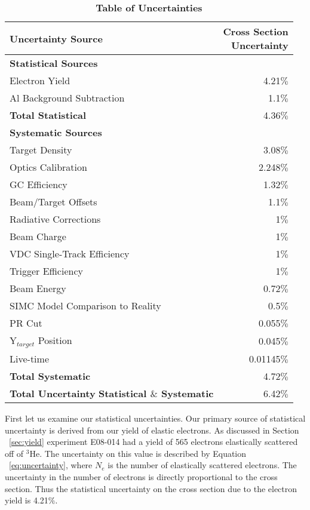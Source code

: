 \begin{table}[!h]
\centering
\begin{tabular}{|l | r |}
\hline
\textbf{Uncertainty Source} & \makecell{\textbf{Cross Section}\\ \textbf{Uncertainty}} \\
\hline
\textbf{Statistical Sources} &  \\ 
\hline
Electron Yield & 4.21$\%$\\
Al Background Subtraction & 1.1$\%$\\
\textbf{Total Statistical} &  4.36$\%$\\
\hline
\textbf{Systematic Sources} &  \\
\hline
Target Density & 3.08$\%$\\
Optics Calibration & 2.248$\%$\\
GC Efficiency & 1.32$\%$\\
Beam/Target Offsets & 1.1$\%$\\
Radiative Corrections & 1$\%$\\
Beam Charge & 1$\%$\\
VDC Single-Track Efficiency & 1$\%$\\
Trigger Efficiency & 1$\%$\\
Beam Energy & 0.72$\%$\\
SIMC Model Comparison to Reality & 0.5$\%$\\
PR Cut & 0.055$\%$\\ 
Y$_{target}$ Position & 0.045$\%$\\
Live-time & 0.01145$\%$\\
\textbf{Total Systematic} &  4.72$\%$\\
\hline
\makecell{\textbf{Total Uncertainty}\\ \textbf{Statistical $\&$ Systematic}} &  6.42$\%$\\
\hline
\end{tabular}
\caption{{\bf{Table of Uncertainties}} }
\label{tab:uncertainty}
\end{table}

First let us examine our statistical uncertainties. Our primary source of statistical uncertainty is derived from our yield of elastic electrons. As discussed in Section ~\ref{sec:yield} experiment E08-014 had a yield of 565 electrons elastically scattered off of $^3$He. The uncertainty on this value is described by Equation ~\ref{eq:uncertainty}, where $N_e$ is the number of elastically scattered electrons. The uncertainty in the number of electrons is directly proportional to the cross section. Thus the statistical uncertainty on the cross section due to the electron yield is 4.21$\%$.


